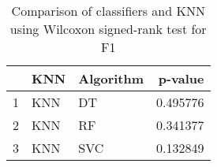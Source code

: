 \begin{table}
\footnotesize
\caption{Comparison of classifiers and KNN using Wilcoxon signed-rank test for F1}
\label{tab:KNN wilcoxon F1 comparison}
\begin{tabular}{lllr}
\hline
 & KNN & Algorithm & p-value \\
\hline
1 & KNN & DT & 0.495776 \\
2 & KNN & RF & 0.341377 \\
3 & KNN & SVC & 0.132849 \\
\hline
\end{tabular}
\end{table}
